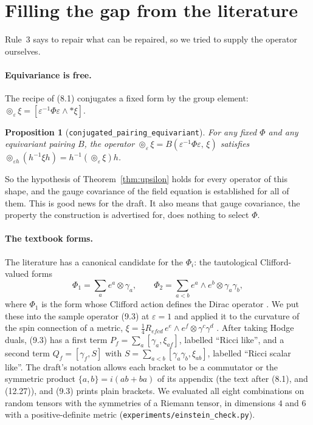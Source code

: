 \documentclass[11pt]{article}
\newtheorem{proposition}[theorem]{Proposition}
\theoremstyle{remark}
\newcommand{\eps}{\varepsilon}
\newcommand{\Sh}{\circledcirc}
\newcommand{\lean}[1]{\texttt{#1}}
\begin{document}
\section{Filling the gap from the literature}\label{sec:fill}

Rule~3 says to repair what can be repaired, so we tried to supply the operator ourselves.

\paragraph{Equivariance is free.} The recipe of (8.1) conjugates a fixed form by the group
element: $\Sh_\eps\xi=[\eps^{-1}\Phi\eps\wedge *\xi]$.

\begin{proposition}[\lean{conjugated\_pairing\_equivariant}]
For any fixed $\Phi$ and any equivariant pairing $B$, the operator
$\Sh_\eps\xi=B(\eps^{-1}\Phi\eps,\,\xi)$ satisfies
$\Sh_{\eps h}(h^{-1}\xi h)=h^{-1}(\Sh_\eps\xi)h$.
\end{proposition}

So the hypothesis of Theorem~\ref{thm:upsilon} holds for every operator of this shape, and the gauge covariance
of the field equation is established for all of them. This is good news for the draft. It also
means that gauge covariance, the property the construction is advertised for, does nothing to
select $\Phi$.

\paragraph{The textbook forms.} The literature has a canonical candidate for the $\Phi_i$: the
tautological Clifford-valued forms
\[
\Phi_1=\sum_a e^a\otimes\gamma_a,\qquad \Phi_2=\sum_{a<b} e^a\wedge e^b\otimes\gamma_a\gamma_b ,
\]
where $\Phi_1$ is the form whose Clifford action defines the Dirac operator
\cite[Chapter~II, Section~5]{LM}. We put these into
the sample operator (9.3) at $\eps=1$ and applied it to the curvature of the spin connection of
a metric, $\xi=\tfrac14 R_{efcd}\,e^e\wedge e^f\otimes\gamma^c\gamma^d$
\cite[Chapter~II, Section~4]{LM}. After taking Hodge
duals, (9.3) has a first term $P_f=\sum_a[\gamma_a,\xi_{af}]$, labelled ``Ricci like'', and a
second term $Q_f=[\gamma_f,S]$ with $S=\sum_{a<b}[\gamma_a\gamma_b,\xi_{ab}]$, labelled
``Ricci scalar like''. The draft's notation allows each bracket to be a commutator or the
symmetric product $\{a,b\}=i(ab+ba)$ of its appendix (the text after (8.1), and (12.27)), and
(9.3) prints plain brackets. We
evaluated all eight combinations on random tensors with the symmetries of a Riemann tensor, in
dimensions $4$ and $6$ with a positive-definite metric
(\lean{experiments/einstein\_check.py}).
\end{document}
